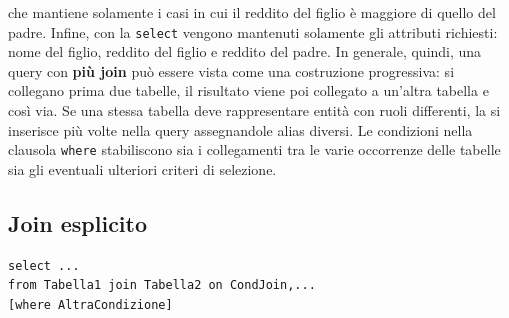 \noindent che mantiene solamente i casi in cui il reddito del figlio è maggiore di quello del padre. Infine, con la \texttt{select} vengono mantenuti solamente gli attributi richiesti: nome del figlio, reddito del figlio e reddito del padre.
In generale, quindi, una query con \textbf{più join} può essere vista come una costruzione progressiva: si collegano prima due tabelle, il risultato viene poi collegato a un'altra tabella e così via. Se una stessa tabella deve rappresentare entità con ruoli differenti, la si inserisce più volte nella query assegnandole alias diversi. Le condizioni nella clausola \texttt{where} stabiliscono sia i collegamenti tra le varie occorrenze delle tabelle sia gli eventuali ulteriori criteri di selezione.

\subsection{Join esplicito}
\begin{verbatim}
select ...
from Tabella1 join Tabella2 on CondJoin,...
[where AltraCondizione]
\end{verbatim}

